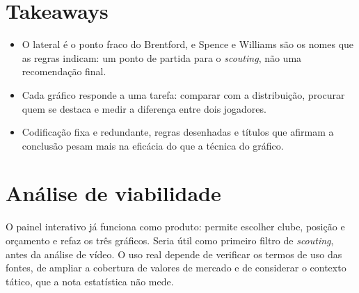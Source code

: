 \documentclass[10pt, a4paper, twocolumn]{article}
\begin{document}
\section{Takeaways}

\begin{itemize}
	\item O lateral é o ponto fraco do Brentford, e Spence e Williams são os nomes que as regras indicam: um ponto de partida para o \emph{scouting}, não uma recomendação final.
	\item Cada gráfico responde a uma tarefa: comparar com a distribuição, procurar quem se destaca e medir a diferença entre dois jogadores.
	\item Codificação fixa e redundante, regras desenhadas e títulos que afirmam a conclusão pesam mais na eficácia do que a técnica do gráfico.
\end{itemize}

\section{Análise de viabilidade}

O painel interativo já funciona como produto: permite escolher clube, posição e orçamento e refaz os três gráficos. Seria útil como primeiro filtro de \emph{scouting}, antes da análise de vídeo. O uso real depende de verificar os termos de uso das fontes, de ampliar a cobertura de valores de mercado e de considerar o contexto tático, que a nota estatística não mede.

\printbibliography[title={Referências}] %
\end{document}
